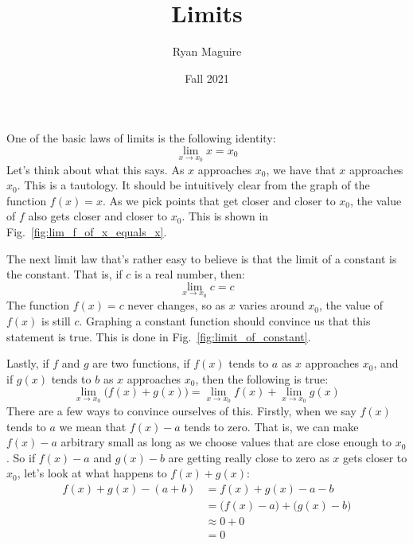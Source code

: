\documentclass{article}
\title{Limits}
\author{Ryan Maguire}
\date{Fall 2021}
\begin{document}
    \maketitle
    One of the basic laws of limits is the following identity:
    \begin{equation}
        \lim_{x\rightarrow{x_{0}}}x=x_{0}
    \end{equation}
    Let's think about what this says. As $x$ approaches $x_{0}$, we have that
    $x$ approaches $x_{0}$. This is a tautology. It should be intuitively clear
    from the graph of the function $f(x)=x$. As we pick points that get
    closer and closer to $x_{0}$, the value of $f$ also gets closer and closer
    to $x_{0}$. This is shown in Fig.~\ref{fig:lim_f_of_x_equals_x}.
    \par\hfill\par
    The next limit law that's rather easy to believe is that the limit of a
    constant is the constant. That is, if $c$ is a real number, then:
    \begin{equation}
        \lim_{x\rightarrow{x_{0}}}c=c
    \end{equation}
    The function $f(x)=c$ never changes, so as $x$ varies around $x_{0}$,
    the value of $f(x)$ is still $c$. Graphing a constant function should
    convince us that this statement is true. This is done in
    Fig.~\ref{fig:limit_of_constant}.
    \par\hfill\par
    Lastly, if $f$ and $g$ are two functions, if $f(x)$ tends to $a$ as
    $x$ approaches $x_{0}$, and if $g(x)$ tends to $b$ as $x$ approaches
    $x_{0}$, then the following is true:
    \begin{equation}
        \label{eqn:add_limit_law}%
        \lim_{x\rightarrow{x}_{0}}\big(f(x)+g(x)\big)
        =\lim_{x\rightarrow{x}_{0}}f(x)+
            \lim_{x\rightarrow{x}_{0}}g(x)
    \end{equation}
    There are a few ways to convince ourselves of this. Firstly, when we
    say $f(x)$ tends to $a$ we mean that $f(x)-a$ tends to zero. That is, we
    can make $f(x)-a$ arbitrary small as long as we choose values that are
    close enough to $x_{0}$. So if $f(x)-a$ and $g(x)-b$ are getting really
    close to zero as $x$ gets closer to $x_{0}$, let's look at what happens
    to $f(x)+g(x)$:
    \begin{align}
        f(x)+g(x)-(a+b)&=f(x)+g(x)-a-b\\
        &=\big(f(x)-a\big)+\big(g(x)-b\big)\\
        &\approx{0}+0\\
        &=0
    \end{align}
\end{document}
